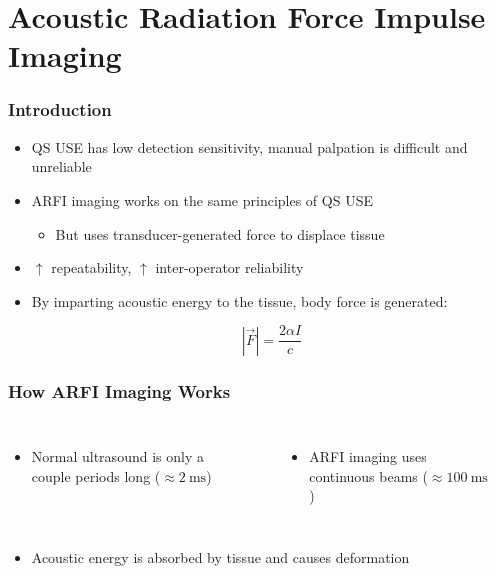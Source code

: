 \documentclass{beamer}
\begin{document}
	\section[ARFI]{Acoustic Radiation Force Impulse Imaging}
		\begin{frame}
			\frametitle{Introduction}
			\begin{itemize}
				\item QS USE has low detection sensitivity, manual palpation is difficult and unreliable
				\item \alert{ARFI} imaging works on the same principles of QS USE
				\begin{itemize}
					\item But uses transducer-generated force to displace tissue
				\end{itemize}
				\item $\uparrow$ repeatability, $\uparrow$ inter-operator reliability
				\item By imparting acoustic energy to the tissue, body force is generated:

					\begin{equation*}
						\left|\vec{F}\right| = \frac{2\alpha I}{c}
					\end{equation*}
			\end{itemize}
		\end{frame}

		\begin{frame}
			\frametitle{How ARFI Imaging Works}
			\begin{columns}[t]
					\begin{itemize}
						\item Normal ultrasound is only a couple periods long ($\approx \SI{2}{\ms}$)
					\end{itemize}

					\begin{center}
					\end{center}

					\begin{itemize}
						\item ARFI imaging uses continuous beams ($\approx \SI{100}{\ms}$)
					\end{itemize}

					\begin{center}
					\end{center}
			\end{columns}

			\begin{itemize}
				\item Acoustic energy is absorbed by tissue and causes deformation
			\end{itemize}
		\end{frame}
\end{document}
